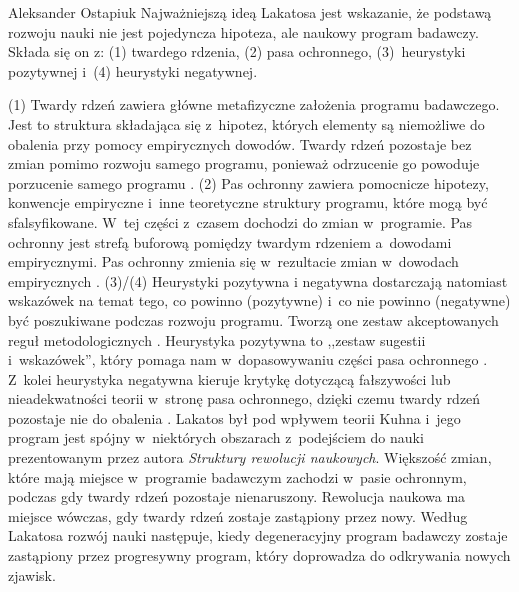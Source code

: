 \begin{artplenv}{Aleksander Ostapiuk}
Najważniejszą ideą Lakatosa jest wskazanie, że podstawą rozwoju nauki nie jest pojedyncza hipoteza, ale naukowy program
badawczy. Składa się on z: (1) twardego rdzenia, (2) pasa ochronnego, (3)~heurystyki pozytywnej  i~(4) heurystyki negatywnej. 

(1) Twardy rdzeń zawiera główne metafizyczne założenia programu badawczego. Jest to struktura składająca
się z~hipotez, których elementy są niemożliwe do obalenia przy pomocy empirycznych dowodów. Twardy rdzeń pozostaje bez zmian
pomimo rozwoju samego programu, ponieważ odrzucenie go powoduje porzucenie samego programu
\parencite[s.~122]{hands_reflection_2001}.
(2) Pas ochronny zawiera pomocnicze hipotezy, konwencje
empiryczne i~inne teoretyczne struktury programu, które mogą być sfalsyfikowane. W~tej części z~czasem dochodzi do
zmian w~programie. Pas ochronny jest strefą buforową pomiędzy twardym rdzeniem a~dowodami empirycznymi. Pas ochronny zmienia
się w~rezultacie zmian w~dowodach empirycznych
\parencite[s.~122]{hands_reflection_2001}.
(3)/(4)
Heurystyki pozytywna i negatywna dostarczają natomiast wskazówek na temat tego, co powinno (pozytywne) i~co nie powinno (negatywne)
być poszukiwane podczas rozwoju programu. Tworzą one zestaw akceptowanych reguł metodologicznych
\parencite[s.~47]{lakatos_falsification_1970}.
Heurystyka pozytywna to ,,zestaw sugestii i~wskazówek'', który pomaga
nam w~dopasowywaniu części pasa ochronnego
\parencite[s.~50]{lakatos_falsification_1970}.
Z~kolei heurystyka negatywna
kieruje krytykę dotyczącą fałszywości lub nieadekwatności teorii w~stronę pasa ochronnego, dzięki czemu
twardy rdzeń pozostaje nie do obalenia
\parencite[s.~48–50]{lakatos_falsification_1970}.
Lakatos był pod wpływem
teorii Kuhna
\parencite*{kuhn_structure_1962}
i~jego program jest spójny w~niektórych obszarach z~podejściem do nauki
prezentowanym przez autora \textit{Struktury rewolucji naukowych}. Większość zmian, które mają miejsce w~programie
badawczym zachodzi w~pasie ochronnym, podczas gdy twardy rdzeń pozostaje nienaruszony. Rewolucja naukowa ma miejsce
wówczas, gdy twardy rdzeń zostaje zastąpiony przez nowy. Według Lakatosa rozwój nauki następuje, kiedy degeneracyjny program
badawczy zostaje zastąpiony przez progresywny program, który doprowadza do odkrywania nowych zjawisk.


\end{artplenv}
